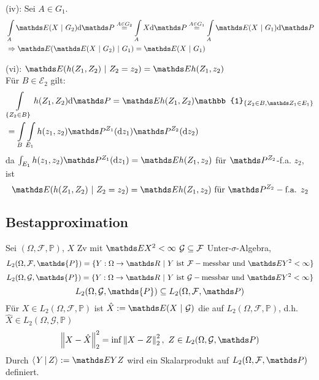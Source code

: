 (iv): Sei $A\in G_1$.
\begin{equation*}
\begin{aligned}
	&\int\limits_A \E(X~|~G_2)\dint\Pw \stackrel{A\in G_2}{=} \int\limits_A X\dint\Pw \stackrel{A\in G_1}{=} \int\limits_A \E(X~|~G_1)\dint\Pw\\
	&\Rightarrow \E(\E(X~|~G_2)~|~G_1)=\E(X~|~G_1)
\end{aligned}
\end{equation*}

(vi): \zz $\E(h(Z_1,Z_2)~|~ Z_2=z_2)=\E h(Z_1,z_2)$\\
Für $B\in \mathcal{E}_2$ gilt:
\begin{equation*}
\begin{aligned}
	&\int\limits_{\{Z_2\in B\}} h(Z_1,Z_2)\dint\Pw = \E h(Z_1,Z_2)\mathbb{1}_{\{Z_2\in B,\Z_1\in E_1 \}}\\
	&=\int\limits_B\int\limits_{E_1}h(z_1,z_2)\Pw^{Z_1}(\dint z_1)\Pw^{Z_2}(\dint z_2)
\end{aligned}
\end{equation*}
da $\int_{E_1}h(z_1,z_2)\Pw^{Z_1}(\dint z_1)= \E h(Z_1,z_2)$ für $\Pw^{Z_2}$-f.a. $z_2$, ist 
\[\E(h(Z_1,Z_2)~|~ Z_2=z_2)=\E h(Z_1,z_2) \text{ für }\Pw^{Z_2}-\text{f.a. } z_2 \]

\subsection{Bestapproximation}
Sei $(\Omega,\mathcal{F},\mathds{P})$, $X$ Zv mit $\E X^2<\infty$ $\mathcal{G}\subseteq \mathcal{F}$ Unter-$\sigma$-Algebra,
\[L_2(\Omega,\mathcal{F},\mathds{P})= \{Y:\Omega\to \R~|~Y \text{ ist }\mathcal{F}-\text{messbar und }\E Y^2<\infty \} \]
\[L_2(\Omega,\mathcal{G},\mathds{P})= \{Y:\Omega\to \R~|~Y \text{ ist }\G-\text{messbar und }\E Y^2<\infty \} \]
\[ L_2(\Omega,\mathcal{G},\mathds{P})\subseteq L_2(\Omega,\mathcal{F},\Pw)\]
Für $X\in L_2(\Omega,\mathcal{F},\mathds{P})$ ist $\hat{X}:= \E(X~|~\mathcal{G})$ die  auf $L_2(\Omega,\mathcal{F},\mathds{P})$, d.h. $\hat{X}\in L_2(\Omega,\mathcal{G},\mathds{P})$
\[ \norm{X-\hat{X}}_2^2=\inf\norm{X-Z}_2^2,~Z\in L_2(\Omega,\G,\Pw) \]
Durch $\sprod{Y}{Z}:=\E YZ $ wird ein Skalarprodukt auf $L_2(\Omega,\mathcal{F},\Pw)$ definiert.

